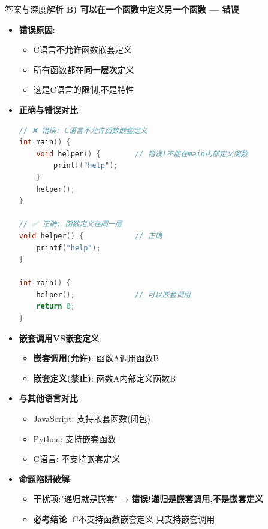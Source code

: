 \documentclass[a4paper,12pt]{article}
\begin{document}
\begin{bluebox}{答案与深度解析}
	\textbf{B) 可以在一个函数中定义另一个函数 — 错误}
	\begin{itemize}[leftmargin=*, nosep]
		\item \textbf{错误原因}:
		      \begin{itemize}
			      \item C语言\textbf{不允许}函数嵌套定义
			      \item 所有函数都在\textbf{同一层次}定义
			      \item 这是C语言的限制,不是特性
		      \end{itemize}

		\item \textbf{正确与错误对比}:
		      \begin{lstlisting}[language=C]
// ❌ 错误: C语言不允许函数嵌套定义
int main() {
    void helper() {        // 错误!不能在main内部定义函数
        printf("help");
    }
    helper();
}

// ✅ 正确: 函数定义在同一层
void helper() {            // 正确
    printf("help");
}

int main() {
    helper();              // 可以嵌套调用
    return 0;
}
    \end{lstlisting}

		\item \textbf{嵌套调用VS嵌套定义}:
		      \begin{itemize}
			      \item \textbf{嵌套调用(允许)}: 函数A调用函数B
			      \item \textbf{嵌套定义(禁止)}: 函数A内部定义函数B
		      \end{itemize}

		\item \textbf{与其他语言对比}:
		      \begin{itemize}
			      \item JavaScript: 支持嵌套函数(闭包)
			      \item Python: 支持嵌套函数
			      \item C语言: 不支持嵌套定义
		      \end{itemize}

		\item \textbf{命题陷阱破解}:
		      \begin{itemize}
			      \item 干扰项:"递归就是嵌套" → \textbf{错误!递归是嵌套调用,不是嵌套定义}
			      \item \textbf{必考结论}: C不支持函数嵌套定义,只支持嵌套调用
		      \end{itemize}
	\end{itemize}


\end{bluebox}
\end{document}
